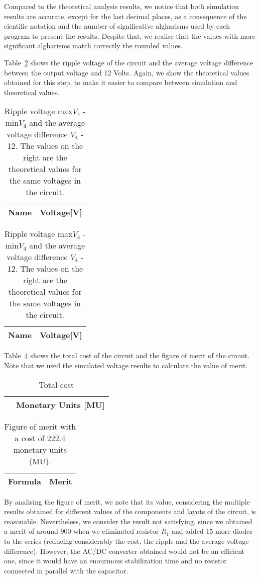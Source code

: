 	Compared to the theoretical analysis results, we notice that both simulation results are accurate, except for the last 
decimal places, as a consequence of the cientific notation and the number of significative algharisms used by each program to 
present the results. Despite that, we realise that the values with more significant algharisms match correctly the rounded values.


Table~\ref{tab2:op} shows the ripple voltage of the circuit and the average voltage difference
between the output voltage and 12 Volts. Again, we show the theoretical values obtained for this step, 
to make it easier to compare between simulation and theoretical values.


\begin{table}[H]
  \centering
  \begin{tabular}{|l|r|}
    \hline    
    {\bf Name} & {\bf Voltage[V]} \\ \hline
    
  \end{tabular}
  \begin{tabular}{|l|r|}
    \hline    
    {\bf Name} & {\bf Voltage[V]} \\ \hline
    
  \end{tabular}
  \caption{Ripple voltage max$V_4$ - min$V_4$ and the average voltage difference $V_4$ - 12. The values on the right are the theoretical 
  values for the same voltages in the circuit.}
  \label{tab2:op}
\end{table}


Table~\ref{tab3:op} shows the total cost of the circuit and the figure of merit of the circuit. 
Note that we used the simulated voltage results to calculate the value of merit.
\begin{table}[H]
  \centering
  \begin{tabular}{|l|r|}
     \hline    
    { } & {\bf Monetary Units [MU]} \\ \hline   
    
  \end{tabular}
  \caption{Total cost}
  \label{tab:cost}
\end{table}


\begin{table}[H]
  \centering
  \begin{tabular}{|l|r|}
    \hline    
    {\bf Formula} & {\bf Merit} \\ \hline
    
  \end{tabular}
  \caption{Figure of merit with a cost of 222.4 monetary units (MU).}
  \label{tab3:op}
\end{table}

By analising the figure of merit, we note that its value, considering the multiple results obtained for different values of the components and layots of the circuit, is
reasonable. Nevertheless, we consider the result not satisfying, since we obtained a merit of around 900 when we eliminated resistor $R_1$ and added 15 more diodes to the series
(reducing considerably the cost, the ripple and the average voltage difference). However, the AC/DC converter obtained would not be an efficient one, since it would have an enourmous
stabilization time and no resistor connected in parallel with the capacitor.

